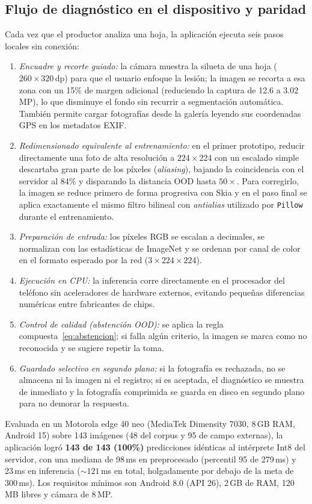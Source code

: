 \documentclass[conference,letterpaper]{IEEEtran}
\begin{document}
\subsection{Flujo de diagnóstico en el dispositivo y paridad}
Cada vez que el productor analiza una hoja, la aplicación ejecuta seis pasos locales sin conexión:
\begin{enumerate}
\item \textit{Encuadre y recorte guiado:} la cámara muestra la silueta de una hoja ($260\times320$\,dp) para que el usuario enfoque la lesión; la imagen se recorta a esa zona con un 15\% de margen adicional (reduciendo la captura de 12.6 a 3.02\,MP), lo que disminuye el fondo sin recurrir a segmentación automática. También permite cargar fotografías desde la galería leyendo sus coordenadas GPS en los metadatos EXIF.
\item \textit{Redimensionado equivalente al entrenamiento:} en el primer prototipo, reducir directamente una foto de alta resolución a $224\times224$ con un escalado simple descartaba gran parte de los píxeles (\textit{aliasing}), bajando la coincidencia con el servidor al 84\% y disparando la distancia OOD hasta $50\times$. Para corregirlo, la imagen se reduce primero de forma progresiva con Skia y en el paso final se aplica exactamente el mismo filtro bilineal con \textit{antialias} utilizado por \texttt{Pillow} durante el entrenamiento.
\item \textit{Preparación de entrada:} los píxeles RGB se escalan a decimales, se normalizan con las estadísticas de ImageNet y se ordenan por canal de color en el formato esperado por la red ($3\times224\times224$).
\item \textit{Ejecución en CPU:} la inferencia corre directamente en el procesador del teléfono sin aceleradores de hardware externos, evitando pequeñas diferencias numéricas entre fabricantes de chips.
\item \textit{Control de calidad (abstención OOD):} se aplica la regla compuesta~\eqref{eq:abstencion}; si falla algún criterio, la imagen se marca como no reconocida y se sugiere repetir la toma.
\item \textit{Guardado selectivo en segundo plano:} si la fotografía es rechazada, no se almacena ni la imagen ni el registro; si es aceptada, el diagnóstico se muestra de inmediato y la fotografía comprimida se guarda en disco en segundo plano para no demorar la respuesta.
\end{enumerate}

Evaluada en un Motorola edge 40 neo (MediaTek Dimensity 7030, 8\,GB RAM, Android 15) sobre 143 imágenes (48 del corpus y 95 de campo externas), la aplicación logró \textbf{143 de 143 (100\%)} predicciones idénticas al intérprete Int8 del servidor, con una mediana de 98\,ms en preprocesado (percentil 95 de 279\,ms) y 23\,ms en inferencia (${\sim}121$\,ms en total, holgadamente por debajo de la meta de 300\,ms). Los requisitos mínimos son Android 8.0 (API 26), 2\,GB de RAM, 120\,MB libres y cámara de 8\,MP.
\end{document}
